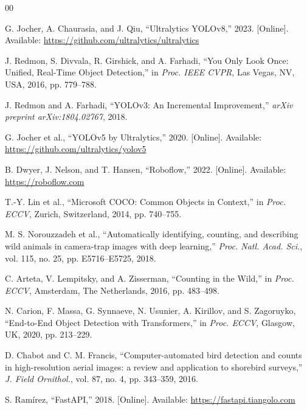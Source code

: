 \documentclass[journal]{IEEEtran}
\begin{document}
\begin{thebibliography}{00}

G. Jocher, A. Chaurasia, and J. Qiu,
``Ultralytics YOLOv8,''
2023. [Online]. Available: \url{https://github.com/ultralytics/ultralytics}

J. Redmon, S. Divvala, R. Girshick, and A. Farhadi,
``You Only Look Once: Unified, Real-Time Object Detection,''
in \textit{Proc. IEEE CVPR}, Las Vegas, NV, USA, 2016, pp. 779--788.

J. Redmon and A. Farhadi,
``YOLOv3: An Incremental Improvement,''
\textit{arXiv preprint arXiv:1804.02767}, 2018.

G. Jocher et al.,
``YOLOv5 by Ultralytics,''
2020. [Online]. Available: \url{https://github.com/ultralytics/yolov5}

B. Dwyer, J. Nelson, and T. Hansen,
``Roboflow,''
2022. [Online]. Available: \url{https://roboflow.com}

T.-Y. Lin et al.,
``Microsoft COCO: Common Objects in Context,''
in \textit{Proc. ECCV}, Zurich, Switzerland, 2014, pp. 740--755.

M. S. Norouzzadeh et al.,
``Automatically identifying, counting, and describing wild animals in camera-trap images with deep learning,''
\textit{Proc. Natl. Acad. Sci.}, vol. 115, no. 25, pp. E5716--E5725, 2018.

C. Arteta, V. Lempitsky, and A. Zisserman,
``Counting in the Wild,''
in \textit{Proc. ECCV}, Amsterdam, The Netherlands, 2016, pp. 483--498.

N. Carion, F. Massa, G. Synnaeve, N. Usunier, A. Kirillov, and S. Zagoruyko,
``End-to-End Object Detection with Transformers,''
in \textit{Proc. ECCV}, Glasgow, UK, 2020, pp. 213--229.

D. Chabot and C. M. Francis,
``Computer-automated bird detection and counts in high-resolution aerial images: a review and application to shorebird surveys,''
\textit{J. Field Ornithol.}, vol. 87, no. 4, pp. 343--359, 2016.

S. Ram\'irez,
``FastAPI,''
2018. [Online]. Available: \url{https://fastapi.tiangolo.com}

\end{thebibliography}
\end{document}
